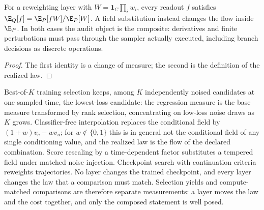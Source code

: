 \begin{proposition}
\label{prop:selection-composite}
For a reweighting layer with $W=\mathbf 1_C\prod_iw_i$, every readout $f$ satisfies
$\E_Q[f]=\E_P[fW]/\E_P[W]$.  A field substitution instead changes the flow inside $\E_P$.  In
both cases the audit object is the composite: derivatives and finite perturbations must pass
through the sampler actually executed, including branch decisions as discrete operations.
\end{proposition}

\begin{proof}
The first identity is a change of measure; the second is the definition of the realized law.
\end{proof}

Best-of-$K$ training selection keeps, among $K$ independently noised candidates at one sampled
time, the lowest-loss candidate: the regression measure is the base measure transformed by rank
selection, concentrating on low-loss noise draws as $K$ grows.  Classifier-free interpolation
replaces the conditional field by $(1+w)v_c-wv_u$; for $w\notin\{0,1\}$ this is in general not
the conditional field of any single conditioning value, and the realized law is the flow of the
declared combination.  Score rescaling by a time-dependent factor substitutes a tempered field
under matched noise injection.  Checkpoint search with continuation criteria reweights
trajectories.  No layer changes the trained checkpoint, and every layer changes the law that a
comparison must match.  Selection yields and compute-matched comparisons are therefore separate
measurements: a layer moves the law and the cost together, and only the composed statement is
well posed.
